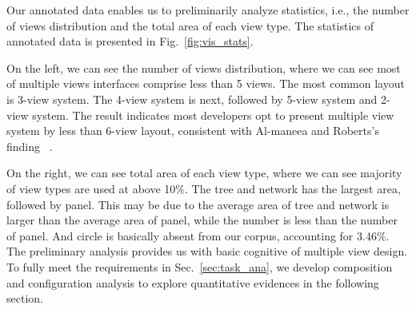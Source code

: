 Our annotated data enables us to preliminarily analyze statistics, i.e., the number of views distribution and the total area of each view type. The statistics of annotated data is presented in Fig.~\ref{fig:vis_stats}.

On the left, we can see the number of views distribution, where we can see most of multiple views interfaces comprise less than 5 views.
The most common layout is 3-view system.
The 4-view system is next, followed by 5-view system and 2-view system.
The result indicates most developers opt to present multiple view system by less than 6-view layout, consistent with Al-maneea and Roberts's finding ~\cite{al-maneea_2019_multipleview}. 

On the right, we can see total area of each view type, where we can see majority of view types are used at above 10$\%$.
The tree and network has the largest area, followed by panel.
This may be due to the average area of tree and network is larger than the average area of panel, while the number is less than the number of panel.
And circle is basically absent from our corpus,
accounting for 3.46$\%$.
The preliminary analysis provides us with basic cognitive of multiple view design.
To fully meet the requirements in Sec.~\ref{sec:task_ana}, we develop composition and configuration analysis to explore quantitative evidences in the following section.
